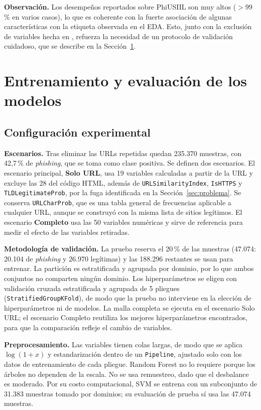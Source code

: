 \documentclass[journal]{IEEEtran}
\begin{document}
\textbf{Observación.} Los desempeños reportados sobre PhiUSIIL son muy altos ($>99$\,\% en varios
casos), lo que es coherente con la fuerte asociación de algunas características con la etiqueta
observada en el EDA. Esto, junto con la exclusión de variables hecha en \cite{yulianti2026},
refuerza la necesidad de un protocolo de validación cuidadoso, que se describe en la
Sección~\ref{sec:modelos}.

\section{Entrenamiento y evaluación de los modelos}
\label{sec:modelos}
\subsection{Configuración experimental}

\textbf{Escenarios.} Tras eliminar las URLs repetidas quedan 235.370 muestras, con 42,7\,\% de
\textit{phishing}, que se toma como clase positiva. Se definen dos escenarios. El escenario
principal, \textbf{Solo URL}, usa 19 variables calculadas a partir de la URL y excluye las 28 del
código HTML, además de \texttt{URLSimilarityIndex}, \texttt{IsHTTPS} y \texttt{TLDLegitimateProb},
por la fuga identificada en la Sección~\ref{sec:problema}. Se conserva \texttt{URLCharProb}, que es
una tabla general de frecuencias aplicable a cualquier URL, aunque se construyó con la misma lista
de sitios legítimos. El escenario \textbf{Completo} usa las 50 variables numéricas y sirve de
referencia para medir el efecto de las variables retiradas.

\textbf{Metodología de validación.} La prueba reserva el 20\,\% de las muestras (47.074: 20.104 de
\textit{phishing} y 26.970 legítimas) y las 188.296 restantes se usan para entrenar. La partición es
estratificada y agrupada por dominio, por lo que ambos conjuntos no comparten ningún dominio. Los
hiperparámetros se eligen con validación cruzada estratificada y agrupada de 5 pliegues
(\texttt{StratifiedGroupKFold}), de modo que la prueba no interviene en la elección de
hiperparámetros ni de modelos. La malla completa se ejecuta en el escenario Solo URL; el escenario Completo reutiliza
los mejores hiperparámetros encontrados, para que la comparación refleje el cambio de variables.

\textbf{Preprocesamiento.} Las variables tienen colas largas, de modo que se aplica $\log(1+x)$ y
estandarización dentro de un \texttt{Pipeline}, ajustado solo con los datos de entrenamiento de
cada pliegue. Random Forest no lo requiere porque los árboles no dependen de la escala. No se usa
remuestreo, dado que el desbalance es moderado. Por su costo computacional, SVM se entrena con un
subconjunto de 31.383 muestras tomado por dominios; su evaluación de prueba sí usa las 47.074
muestras.
\end{document}
